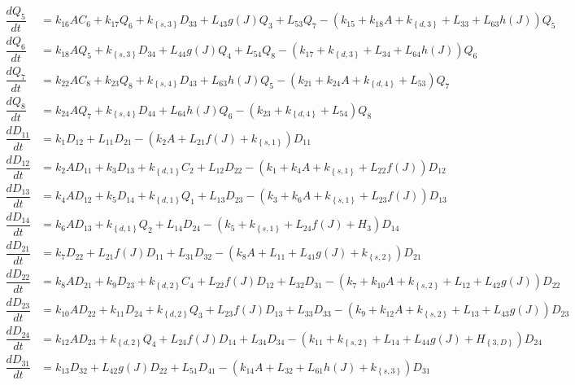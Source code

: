 \begin{align*}
\dfrac{dQ_{5}}{dt} & =k_{16}AC_{6}+k_{17}Q_{6}+k_\left\{s,3\right\}D_{33}+L_{43}g\left(J\right)Q_{3}+L_{53}Q_{7}-\left(k_{15}+k_{18}A+k_\left\{d,3\right\}+L_{33}+L_{63}h\left(J\right)\right)Q_{5}\\
\dfrac{dQ_{6}}{dt} & =k_{18}AQ_{5}+k_\left\{s,3\right\}D_{34}+L_{44}g\left(J\right)Q_{4}+L_{54}Q_{8}-\left(k_{17}+k_\left\{d,3\right\}+L_{34}+L_{64}h\left(J\right)\right)Q_{6}\\
\dfrac{dQ_{7}}{dt} & =k_{22}AC_{8}+k_{23}Q_{8}+k_\left\{s,4\right\}D_{43}+L_{63}h\left(J\right)Q_{5}-\left(k_{21}+k_{24}A+k_\left\{d,4\right\}+L_{53}\right)Q_{7}\\
\dfrac{dQ_{8}}{dt} & =k_{24}AQ_{7}+k_\left\{s,4\right\}D_{44}+L_{64}h\left(J\right)Q_{6}-\left(k_{23}+k_\left\{d,4\right\}+L_{54}\right)Q_{8}\\
\dfrac{dD_{11}}{dt} & =k_{1}D_{12}+L_{11}D_{21}-\left(k_{2}A+L_{21}f\left(J\right)+k_\left\{s,1\right\}\right)D_{11}\\
\dfrac{dD_{12}}{dt} & =k_{2}AD_{11}+k_{3}D_{13}+k_\left\{d,1\right\}C_{2}+L_{12}D_{22}-\left(k_{1}+k_{4}A+k_\left\{s,1\right\}+L_{22}f\left(J\right)\right)D_{12}\\
\dfrac{dD_{13}}{dt} & =k_{4}AD_{12}+k_{5}D_{14}+k_\left\{d,1\right\}Q_{1}+L_{13}D_{23}-\left(k_{3}+k_{6}A+k_\left\{s,1\right\}+L_{23}f\left(J\right)\right)D_{13}\\
\dfrac{dD_{14}}{dt} & =k_{6}AD_{13}+k_\left\{d,1\right\}Q_{2}+L_{14}D_{24}-\left(k_{5}+k_\left\{s,1\right\}+L_{24}f\left(J\right)+H_{3}\right)D_{14}\\
\dfrac{dD_{21}}{dt} & =k_{7}D_{22}+L_{21}f\left(J\right)D_{11}+L_{31}D_{32}-\left(k_{8}A+L_{11}+L_{41}g\left(J\right)+k_\left\{s,2\right\}\right)D_{21}\\
\dfrac{dD_{22}}{dt} & =k_{8}AD_{21}+k_{9}D_{23}+k_\left\{d,2\right\}C_{4}+L_{22}f\left(J\right)D_{12}+L_{32}D_{31}-\left(k_{7}+k_{10}A+k_\left\{s,2\right\}+L_{12}+L_{42}g\left(J\right)\right)D_{22}\\
\dfrac{dD_{23}}{dt} & =k_{10}AD_{22}+k_{11}D_{24}+k_\left\{d,2\right\}Q_{3}+L_{23}f\left(J\right)D_{13}+L_{33}D_{33}-\left(k_{9}+k_{12}A+k_\left\{s,2\right\}+L_{13}+L_{43}g\left(J\right)\right)D_{23}\\
\dfrac{dD_{24}}{dt} & =k_{12}AD_{23}+k_\left\{d,2\right\}Q_{4}+L_{24}f\left(J\right)D_{14}+L_{34}D_{34}-\left(k_{11}+k_\left\{s,2\right\}+L_{14}+L_{44}g\left(J\right)+H_\left\{3,D\right\}\right)D_{24}\\
\dfrac{dD_{31}}{dt} & =k_{13}D_{32}+L_{42}g\left(J\right)D_{22}+L_{51}D_{41}-\left(k_{14}A+L_{32}+L_{61}h\left(J\right)+k_\left\{s,3\right\}\right)D_{31}\\

\end{align*}
